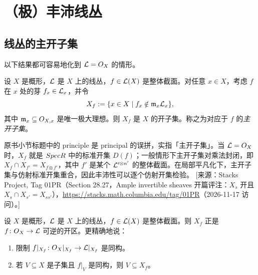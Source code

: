 
\providecommand{\Sym}{\operatorname{Sym}}
\providecommand{\QCoh}{\mathsf{QCoh}}
\providecommand{\Sub}{\operatorname{Sub}}

\section{（极）丰沛线丛}\label{sec:28}

\subsection{线丛的主开子集}\label{sec:28.1}

以下结果都可容易地化到 $\mathcal{L}=O_X$ 的情形。

\begin{propdef}\label{prop:28.1.1}
设 $X$ 是概形，$\mathcal{L}$ 是 $X$ 上的线丛，$f\in\mathcal{L}(X)$ 是整体截面。对任意 $x\in X$，考虑 $f$ 在 $x$ 处的芽 $f_x\in\mathcal{L}_x$，并令
\[
X_f := \{x\in X \mid f_x\notin \mathfrak m_x\mathcal{L}_x\},
\]
其中 $\mathfrak m_x\subseteq O_{X,x}$ 是唯一极大理想。则 $X_f$ 是 $X$ 的开子集。称之为对应于 $f$ 的\emph{主开子集}。
\end{propdef}

\begin{yizhu}
原书小节标题中的 principle 是 principal 的误拼，实指「主开子集」。当 $\mathcal{L}=O_X$ 时，$X_f$ 就是 $Spec R$ 中的标准开集 $D(f)$；一般情形下主开子集对乘法封闭，即 $X_f\cap X_{f'}=X_{f\otimes f'}$，其中 $f'$ 是某个 $\mathcal{L}'^{\otimes n'}$ 的整体截面。在局部平凡化下，主开子集与仿射标准开集重合，因此丰沛性可以逐个仿射开集检验。
[来源：Stacks Project, Tag 01PR（Section 28.27，Ample invertible sheaves 开篇评注：$X_s$ 开且 $X_s\cap X_{s'}=X_{ss'}$），\url{https://stacks.math.columbia.edu/tag/01PR}（2026-11-17 访问）。]
\end{yizhu}

\begin{lemma}\label{lem:28.1.2}
设 $X$ 是概形，$\mathcal{L}$ 是 $X$ 上的线丛，$f\in\mathcal{L}(X)$ 是整体截面。则 $X_f$ 正是 $f\colon O_X\to\mathcal{L}$ 可逆的开区。更精确地说：
\begin{enumerate}[label=(\arabic*),leftmargin=2.4em,itemsep=0.25ex]
  \item 限制 $f|_{X_f}\colon O_X|_{X_f}\to\mathcal{L}|_{X_f}$ 是同构。
  \item 若 $V\subseteq X$ 是子集且 $f|_V$ 是同构，则 $V\subseteq X_f$。
\end{enumerate}
\end{lemma}

